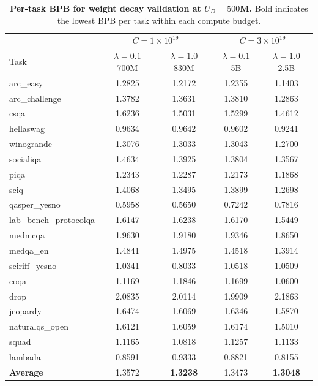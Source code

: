 \begin{table}[t]
    \centering
    \caption{\textbf{Per-task BPB for weight decay validation at $U_D = 500$M.} Bold indicates the lowest BPB per task within each compute budget.}
    \label{tab:task_bpb_wd_500m}
    \small
    \begin{tabular}{l cc cc}
        \toprule
        & \multicolumn{2}{c}{$C = 1 \times 10^{19}$} & \multicolumn{2}{c}{$C = 3 \times 10^{19}$} \\
        \cmidrule(lr){2-3} \cmidrule(lr){4-5}
        Task & \makecell{$\lambda\!=\!0.1$\\700M} & \makecell{$\lambda\!=\!1.0$\\830M} & \makecell{$\lambda\!=\!0.1$\\5B} & \makecell{$\lambda\!=\!1.0$\\2.5B} \\
        \midrule
        arc\_easy & 1.2825 & {1.2172} & 1.2355 & {1.1403} \\
        arc\_challenge & 1.3782 & {1.3631} & 1.3810 & {1.2863} \\
        csqa & 1.6236 & {1.5031} & 1.5299 & {1.4612} \\
        hellaswag & {0.9634} & 0.9642 & 0.9602 & {0.9241} \\
        winogrande & 1.3076 & {1.3033} & 1.3043 & {1.2700} \\
        socialiqa & 1.4634 & {1.3925} & 1.3804 & {1.3567} \\
        piqa & {1.2343} & 1.2287 & 1.2173 & {1.1868} \\
        sciq & 1.4068 & {1.3495} & 1.3899 & {1.2698} \\
        qasper\_yesno & 0.5958 & {0.5650} & 0.7242 & 0.7816 \\
        lab\_bench\_protocolqa & {1.6147} & 1.6238 & 1.6170 & {1.5449} \\
        medmcqa & 1.9630 & {1.9180} & 1.9346 & {1.8650} \\
        medqa\_en & {1.4841} & 1.4975 & 1.4518 & {1.3914} \\
        sciriff\_yesno & 1.0341 & {0.8033} & 1.0518 & {1.0509} \\
        \midrule
        coqa & {1.1169} & 1.1846 & 1.1699 & {1.0600} \\
        drop & 2.0835 & {2.0114} & {1.9909} & 2.1863 \\
        jeopardy & 1.6474 & {1.6069} & 1.6346 & {1.5870} \\
        naturalqs\_open & 1.6121 & {1.6059} & 1.6174 & {1.5010} \\
        squad & 1.1165 & {1.0818} & 1.1257 & {1.1133} \\
        \midrule
        lambada & {0.8591} & 0.9333 & 0.8821 & {0.8155} \\
        \midrule
        \textbf{Average} & 1.3572 & \textbf{1.3238} & 1.3473 & \textbf{1.3048} \\
        \bottomrule
    \end{tabular}
\end{table}
